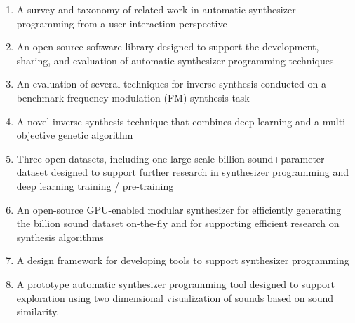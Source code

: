 \begin{enumerate}
    \item A survey and taxonomy of related work in automatic synthesizer programming from a user interaction perspective
    \item An open source software library designed to support the development, sharing, and evaluation of automatic synthesizer programming techniques
    \item An evaluation of several techniques for inverse synthesis conducted on a benchmark frequency modulation (FM) synthesis task
    \item A novel inverse synthesis technique that combines deep learning and a multi-objective genetic algorithm
    \item Three open datasets, including one large-scale billion sound+parameter dataset designed to support further research in synthesizer programming and deep learning training / pre-training
    \item An open-source GPU-enabled modular synthesizer for efficiently generating the billion sound dataset on-the-fly and for supporting efficient research on synthesis algorithms
    \item A design framework for developing tools to support synthesizer programming
    \item A prototype automatic synthesizer programming tool designed to support exploration using two dimensional visualization of sounds based on sound similarity.
\end{enumerate}

